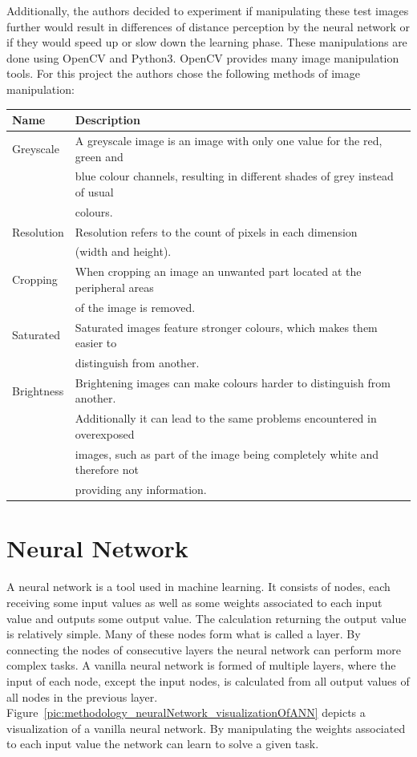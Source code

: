 Additionally, the authors decided to experiment if manipulating these test images further would result in differences of distance perception by the neural network or if they would speed up or slow down the learning phase. These manipulations are done using OpenCV and Python3. OpenCV provides many image manipulation tools. For this project the authors chose the following methods of image manipulation:

\begin{table}[h!]
	\begin{tabular}{|l|l|}
		\hline
		\bfseries Name & \bfseries Description \\
		\hline
		Greyscale & A greyscale image is an image with only one value for the red, green and \\
		& blue colour channels, resulting in different shades of grey instead of usual \\
		& colours. \\
		\hline
		Resolution & Resolution refers to the count of pixels in each dimension \\
		& (width and height). \\
		\hline
		Cropping & When cropping an image an unwanted part located at the peripheral areas \\
		& of the image is removed. \\
		\hline
		Saturated & Saturated images feature stronger colours, which makes them easier to \\
		& distinguish from another. \\
		\hline
		Brightness & Brightening images can make colours harder to distinguish from another. \\
		& Additionally it can lead to the same problems encountered in overexposed \\
		& images, such as part of the image being completely white and therefore not \\
		& providing any information. \\
		\hline
	\end{tabular}
\end{table}

\newpage

\section{Neural Network}
A neural network is a tool used in machine learning. It consists of nodes, each receiving some input values as well as some weights associated to each input value and outputs some output value. The calculation returning the output value is relatively simple. Many of these nodes form what is called a layer. By connecting the nodes of consecutive layers the neural network can perform more complex tasks.
A vanilla neural network is formed of multiple layers, where the input of each node, except the input nodes, is calculated from all output values of all nodes in the previous layer.
Figure~\ref{pic:methodology_neuralNetwork_visualizationOfANN} depicts a visualization of a vanilla neural network. By manipulating the weights associated to each input value the network can learn to solve a given task.

